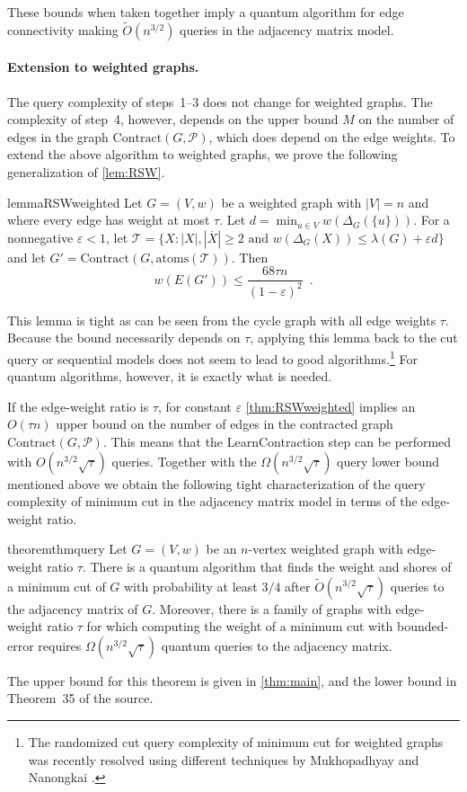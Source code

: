 \documentclass[10pt,a4paper]{article}
\newcommand{\Pcal}{\mathcal{P}}
\newcommand{\Tcal}{\mathcal{T}}
\newcommand{\atoms}{\mathrm{atoms}}
\newcommand{\Contract}{\mathrm{Contract}}
\newcommand{\1}{\mathbf{1}}
\theoremstyle{definition}
\begin{document}
These bounds when taken together imply a quantum algorithm for edge connectivity making $\tilde O(n^{3/2})$ queries in the adjacency matrix model.

\paragraph*{Extension to weighted graphs.}
The query complexity of steps~1--3 does not change for weighted graphs.  The complexity of step~4, however, depends on the upper bound $M$ on the number of 
edges in the graph $\Contract(G, \Pcal)$, which does depend on the edge weights.
To extend the above algorithm to weighted graphs, we prove the following generalization of \cref{lem:RSW}.
\begin{restatable}{lemma}{RSWweighted}
\label{thm:RSWweighted}
Let $G = (V,w)$ be a weighted graph with $|V| =n$ and where every edge has weight at most $\tau$.  Let $d = \min_{u \in V} w(\Delta_G(\{u\}))$.  For a nonnegative $\varepsilon < 1$, let 
$\Tcal = \{X : |X|, |\overline{X}| \ge 2 \mbox{ and } w(\Delta_G(X)) \le \lambda(G) + \varepsilon d\}$ and let $G' = \Contract(G, \atoms(\Tcal))$.  Then 
\[
w(E(G')) \le \frac{68 \tau n}{(1-\varepsilon)^2} \enspace .
\]
\end{restatable}
This lemma is tight as can be seen from the cycle graph with all edge weights $\tau$.  Because the bound necessarily depends on $\tau$, applying this lemma 
back to the cut query or sequential models does not seem to lead to good algorithms.\footnote{The randomized cut query complexity of minimum cut for weighted graphs was 
recently resolved using different techniques by Mukhopadhyay and Nanongkai \cite{MN20}.}
For quantum algorithms, however, it is exactly what is needed.

If the edge-weight ratio is $\tau$, for constant $\varepsilon$ \cref{thm:RSWweighted} implies an $O(\tau n)$ upper bound on the number of edges in the contracted graph $\Contract(G,\Pcal)$.
This means that the LearnContraction step can be performed with $O(n^{3/2}\sqrt{\tau})$ queries.  Together with the $\Omega(n^{3/2}\sqrt{\tau})$ query lower bound mentioned 
above we obtain the following tight characterization of 
the query complexity of minimum cut in the adjacency matrix model in terms of the edge-weight ratio.


\begin{restatable}{theorem}{thmquery} \label{thm:restate_main}
Let $G =(V,w)$ be an $n$-vertex weighted graph with edge-weight ratio $\tau$.  There is a quantum algorithm that finds the 
weight and shores of a minimum cut of $G$ with probability at least $3/4$ after 
$\tilde O(n^{3/2}\sqrt{\tau})$ queries to the adjacency matrix of $G$.  Moreover, there is a family of graphs with edge-weight ratio $\tau$ 
for which computing the weight of a minimum cut with bounded-error requires $\Omega(n^{3/2} \sqrt{\tau})$ quantum queries to the adjacency matrix.
\end{restatable}
The upper bound for this theorem is given in \cref{thm:main}, and the lower bound in Theorem~35 of the source.
\end{document}

